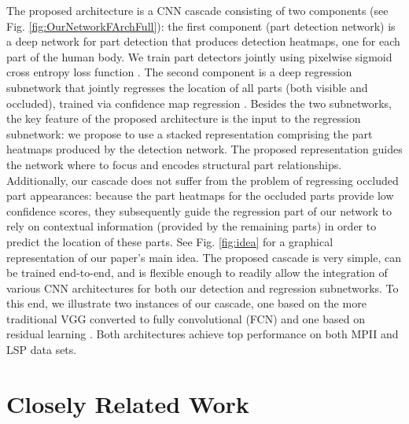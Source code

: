 \documentclass[runningheads]{llncs}
\begin{document}
The proposed architecture is a CNN cascade consisting of two  components (see Fig. \ref{fig:OurNetworkFArchFull}): the first component (part detection network) is a deep network for part detection that produces detection heatmaps, one for each part of the human body. We train part detectors jointly using  pixelwise sigmoid cross entropy loss function \cite{zhang2015fine}. The second component is a deep regression subnetwork that jointly regresses the location of all parts (both visible and occluded), trained via confidence map regression \cite{pfister2015flowing}. Besides the two subnetworks, the key feature of the proposed architecture is the input to the regression subnetwork: we propose to use a stacked representation comprising the part heatmaps produced by the detection network. The proposed representation guides the network where to focus and encodes structural part relationships. Additionally, our cascade does not suffer from the problem of regressing occluded part appearances: because the part heatmaps for the occluded parts provide low confidence scores, they subsequently guide the regression part of our network to rely on contextual information (provided by the remaining parts) in order to predict the location of these parts. See Fig. \ref{fig:idea} for a graphical representation of our paper's main idea. The proposed cascade is very simple, can be trained end-to-end, and is flexible enough to readily allow the integration of various CNN architectures for both our detection and regression subnetworks. To this end, we illustrate two instances of our cascade, one based on the more traditional VGG converted to fully convolutional (FCN) \cite{simonyan2014very, long2015fully} and one based on residual learning \cite{he2016deep, newell2016stacked}. Both architectures achieve top performance on both MPII \cite{andriluka20142d} and LSP \cite{johnson2010clustered} data sets.

\section{Closely Related Work}
\label{S:Related}
\end{document}
